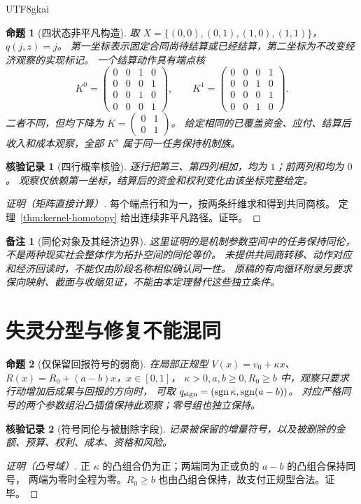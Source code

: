 \documentclass[12pt,a4paper,openany]{report}
\newtheorem{proposition}{命题}[chapter]
\newtheorem{remark}{备注}[chapter]
\newtheorem{Certificate}{核验记录}[chapter]
\newcommand{\Original}{原稿}
\DeclareMathOperator{\sgn}{sgn}
\begin{document}
\begin{CJK*}{UTF8}{gkai}
\begin{proposition}[四状态非平凡构造]
\label{prop:fourstate}
取 $X=\{(0,0),(0,1),(1,0),(1,1)\}$，$q(j,z)=j$。
第一坐标表示固定合同尚待结算或已经结算，第二坐标为不改变经济观察的实现标记。
一个结算动作具有端点核
\[
 K^0=\begin{pmatrix}0&0&1&0\\0&0&0&1\\0&0&1&0\\0&0&0&1\end{pmatrix},
 \qquad
 K^1=\begin{pmatrix}0&0&0&1\\0&0&1&0\\0&0&0&1\\0&0&1&0\end{pmatrix}.
\]
二者不同，但均下降为
$\overline K=\left(\begin{smallmatrix}0&1\\0&1\end{smallmatrix}\right)$。
给定相同的已覆盖资金、应付、结算后收入和成本观察，全部 $K^s$ 属于同一任务保持机制族。
\end{proposition}
\begin{Certificate}[四行概率核验]
逐行把第三、第四列相加，均为 $1$；前两列和均为 $0$。
观察仅依赖第一坐标，结算后的资金和权利变化由该坐标完整给定。
\end{Certificate}
\begin{proof}[证明（矩阵直接计算）]
每个端点行和为一，按两条纤维求和得到共同商核。
定理~\ref{thm:kernel-homotopy} 给出连续非平凡路径。证毕。
\end{proof}

\begin{remark}[同伦对象及其经济边界]
这里证明的是机制参数空间中的任务保持同伦，不是两种现实社会整体作为拓扑空间的同伦等价。
未提供共同商转移、动作对应和经济回读时，不能仅由阶段名称相似确认同一性。
\Original 的有向循环附录另要求保向映射、截面与收缩见证，不能由本定理替代这些独立条件。
\end{remark}

\section{失灵分型与修复不能混同}

\begin{proposition}[仅保留回报符号的弱商]
\label{prop:sign-quotient}
在局部正规型
$V(x)=v_0+\kappa x$、$R(x)=R_0+(a-b)x$，$x\in[0,1]$，
$\kappa>0,a,b\ge0,R_0\ge b$ 中，观察只要求行动增加后成果与回报的方向时，
可取 $q_{\rm sign}=(\sgn\kappa,\sgn(a-b))$。
对应严格同号的两个参数组沿凸插值保持此观察；零号组也独立保持。
\end{proposition}
\begin{Certificate}[符号同伦与被删除字段]
记录被保留的增量符号，以及被删除的金额、预算、权利、成本、资格和风险。
\end{Certificate}
\begin{proof}[证明（凸号域）]
正 $\kappa$ 的凸组合仍为正；两端同为正或负的 $a-b$ 的凸组合保持同号，
两端为零时全程为零。$R_0\ge b$ 也由凸组合保持，故支付正规型合法。证毕。
\end{proof}


\end{CJK*}
\end{document}
